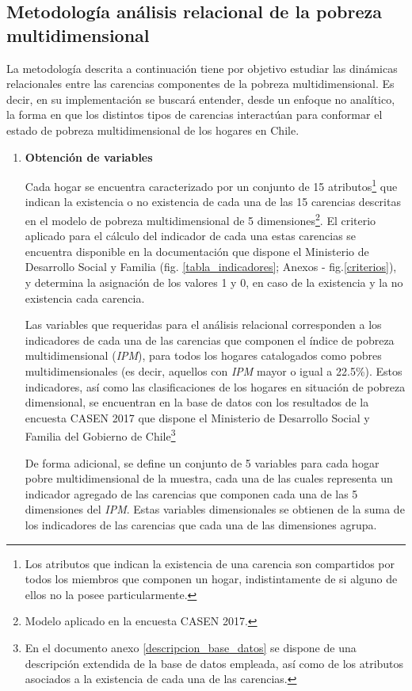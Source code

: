 \documentclass[12pt,letterpaper,spanish]{article}
\begin{document}
\newpage
\subsection{Metodología análisis relacional de la pobreza multidimensional}

La metodología descrita a continuación tiene por objetivo estudiar las dinámicas relacionales entre las carencias componentes de la pobreza multidimensional. Es decir, en su implementación se buscará entender, desde un enfoque no analítico, la forma en que los distintos tipos de carencias interactúan para conformar el estado de pobreza multidimensional de los hogares en Chile.


\begin{enumerate}
\item \textbf{Obtención de variables} 

Cada hogar se encuentra caracterizado por un conjunto de 15 atributos\footnote{Los atributos que indican la existencia de una carencia son compartidos por todos los miembros que componen un hogar, indistintamente de si alguno de ellos no la posee particularmente.} que indican la existencia o no existencia de cada una de las 15 carencias descritas en el modelo de pobreza multidimensional de 5 dimensiones\footnote{Modelo aplicado en la encuesta CASEN 2017.}. El criterio aplicado para el cálculo del indicador de cada una estas carencias se encuentra disponible en la documentación que dispone el Ministerio de Desarrollo Social y Familia (fig. \ref{tabla_indicadores}; Anexos - fig.\ref{criterios}), y determina la asignación de los valores 1 y 0, en caso de la existencia y la no existencia cada carencia. 


Las variables que requeridas para el análisis relacional corresponden a los indicadores de cada  una de las carencias que componen el índice de pobreza multidimensional (\textit{IPM}), para todos los hogares catalogados como pobres multidimensionales (es decir, aquellos con \textit{IPM} mayor o igual a 22.5\%). Estos indicadores, así como las clasificaciones de los hogares en situación de pobreza dimensional, se encuentran en la base de datos con los resultados de la encuesta CASEN 2017 que dispone el Ministerio de Desarrollo Social y Familia del Gobierno de Chile\footnote{En el documento anexo \ref{descripcion_base_datos} se dispone de una descripción extendida de la base de datos empleada, así como de los atributos asociados a la existencia de cada una de las carencias.}


De forma adicional, se define un conjunto de 5 variables para cada hogar pobre multidimensional de la muestra, cada una de las cuales representa un indicador agregado de las carencias que componen cada una de las 5 dimensiones del \textit{IPM}. Estas variables dimensionales se obtienen de la suma de los indicadores de las carencias que cada una de las dimensiones agrupa.\\


\end{enumerate}
\end{document}
